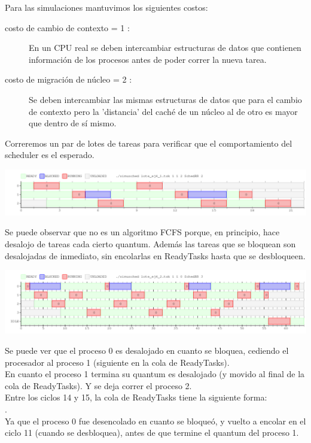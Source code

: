 Para las simulaciones mantuvimos los siguientes costos:
\begin{description}
 \item[costo de cambio de contexto = 1 :]{En un CPU real se deben intercambiar estructuras de datos que contienen información de los procesos antes de poder correr la nueva tarea.}
 \item[costo de migración de núcleo = 2 :]{Se deben intercambiar las mismas estructuras de datos que para el cambio de contexto pero la 'distancia' del caché de un núcleo al de otro es mayor que dentro de sí mismo.}
\end{description}

Correremos un par de lotes de tareas para verificar que el comportamiento del scheduler es el esperado.

\begin{center}
 \includegraphics[scale=0.48]{./RR/RR_simple.png}
\end{center}

Se puede observar que no es un algoritmo FCFS porque, en principio, hace desalojo de tareas cada cierto quantum.
Además las tareas que se bloquean son desalojadas de inmediato, sin encolarlas en ReadyTasks hasta que se desbloqueen.

\begin{center}
 \includegraphics[scale=0.48]{./RR/RR_example_2.png}
\end{center}

Se puede ver que el proceso 0 es desalojado en cuanto se bloquea, cediendo el procesador al
proceso 1 (siguiente en la cola de ReadyTasks).\\
En cuanto el proceso 1 termina su quantum es desalojado (y movido al final de la cola de ReadyTasks).
Y se deja correr el proceso 2.\\

Entre los ciclos 14 y 15, la cola de ReadyTasks tiene la siguiente forma:\\
[3, 2, 0, 1].\\
Ya que el proceso 0 fue desencolado en cuanto se bloqueó, y vuelto a encolar en el
ciclo 11 (cuando se desbloquea), antes de que termine el quantum del proceso 1.\\


